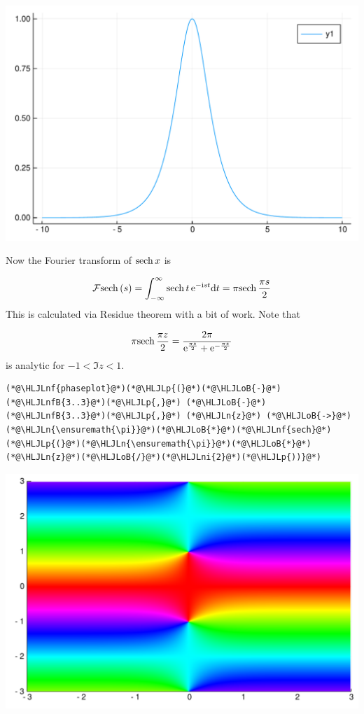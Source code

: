 \documentclass[12pt,a4paper]{article}
\newcommand{\HLJLn}[1]{#1}
\newcommand{\HLJLnf}[1]{\textcolor[RGB]{66,102,213}{#1}}
\newcommand{\HLJLnfB}[1]{\textcolor[RGB]{59,151,46}{#1}}
\newcommand{\HLJLni}[1]{\textcolor[RGB]{59,151,46}{#1}}
\newcommand{\HLJLoB}[1]{\textcolor[RGB]{102,102,102}{\textbf{#1}}}
\newcommand{\HLJLp}[1]{#1}
\def\D{ {\rm d} }
\def\I{ {\rm i} }
\def\E{ {\rm e} }
\def\FF{ {\cal F} }
\def\sech{ {\rm sech}\, }
\def\dt{\D t}
\begin{document}
\includegraphics[width=\linewidth]{figures/Lecture27_1_1.pdf}

Now the Fourier transform of $\sech x$ is

\[
\FF\sech(s) = \int_{-\infty}^\infty \sech t \, \E^{-\I s t} \dt = \pi \sech{\pi s \over 2}
\]
This is calculated via Residue theorem with a bit of work. Note that

\[
\pi \sech {\pi z \over 2} = {2 \pi \over \E^{\pi z \over 2} + \E^{-{\pi z \over 2}}}
\]
is analytic for $-1 < \Im z < 1$.


\begin{lstlisting}
(*@\HLJLnf{phaseplot}@*)(*@\HLJLp{(}@*)(*@\HLJLoB{-}@*)(*@\HLJLnfB{3..3}@*)(*@\HLJLp{,}@*) (*@\HLJLoB{-}@*)(*@\HLJLnfB{3..3}@*)(*@\HLJLp{,}@*) (*@\HLJLn{z}@*) (*@\HLJLoB{->}@*) (*@\HLJLn{\ensuremath{\pi}}@*)(*@\HLJLoB{*}@*)(*@\HLJLnf{sech}@*)(*@\HLJLp{(}@*)(*@\HLJLn{\ensuremath{\pi}}@*)(*@\HLJLoB{*}@*)(*@\HLJLn{z}@*)(*@\HLJLoB{/}@*)(*@\HLJLni{2}@*)(*@\HLJLp{))}@*)
\end{lstlisting}

\includegraphics[width=\linewidth]{figures/Lecture27_2_1.pdf}
\end{document}
